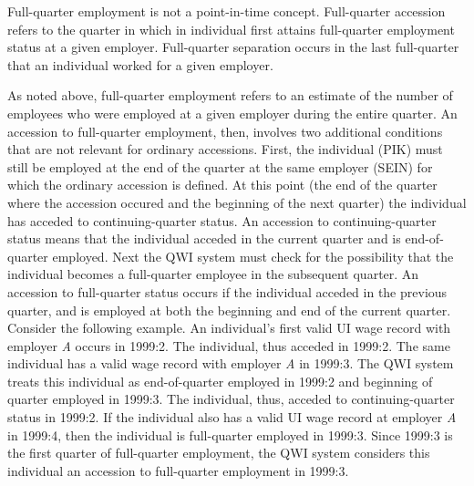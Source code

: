 Full-quarter employment is not a point-in-time concept. Full-quarter
accession refers to the quarter in which in individual first attains
full-quarter employment status at a given employer. Full-quarter separation
occurs in the last full-quarter that an individual worked for a given
employer.

As noted above, full-quarter employment refers to an estimate of the number
of employees who were employed at a given employer during the entire
quarter. An accession to full-quarter employment, then, involves two
additional conditions that are not relevant for ordinary accessions. First,
the individual (PIK) must still be employed at the end of the
quarter at the same employer (SEIN) for which the ordinary
accession is defined. At this point (the end of the quarter where the
accession occured and the beginning of the next quarter) the individual has
acceded to continuing-quarter status. An accession to continuing-quarter
status means that the individual acceded in the current quarter and is
end-of-quarter employed. Next the QWI system must check for the possibility
that the individual becomes a full-quarter employee in the subsequent
quarter. An accession to full-quarter status occurs if the individual
acceded in the previous quarter, and is employed at both the beginning and
end of the current quarter. Consider the following example. An individual's
first valid UI wage record with employer \textit{A} occurs in
1999:2. The individual, thus acceded in 1999:2. The same individual has a
valid wage record with employer \textit{A} in 1999:3. The QWI system treats
this individual as end-of-quarter employed in 1999:2 and beginning of
quarter employed in 1999:3. The individual, thus, acceded to
continuing-quarter status in 1999:2. If the individual also has a valid %
{UI} wage record at employer \textit{A} in 1999:4, then the
individual is full-quarter employed in 1999:3. Since 1999:3 is the first
quarter of full-quarter employment, the QWI system considers this individual
an accession to full-quarter employment in 1999:3.

